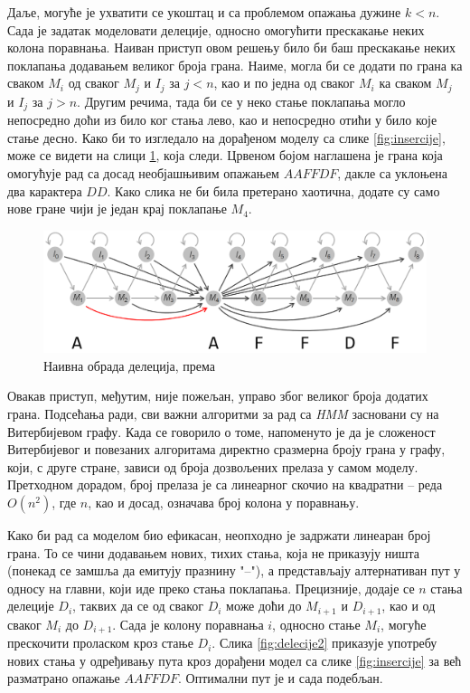 \documentclass[12pt,oneside]{memoir}
\begin{document}
\begin{CJK}{UTF8}{ipxm}
Даље, могуће је ухватити се укоштац и са проблемом опажања дужине $k < n$. Сада је задатак моделовати делеције, односно омогућити прескакање неких колона поравнања. Наиван приступ овом решењу било би баш прескакање неких поклапања додавањем великог броја грана. Наиме, могла би се додати по грана ка сваком $M_i$ од сваког $M_j$ и $I_j$ за $j < n$, као и по једна од сваког $M_i$ ка сваком $M_j$ и $I_j$ за $j > n$. Другим речима, тада би се у неко стање поклапања могло непосредно доћи из било ког стања лево, као и непосредно отићи у било које стање десно. Како би то изгледало на дорађеном моделу са слике \ref{fig:insercije}, може се видети на слици \ref{fig:delecije1}, која следи. Црвеном бојом наглашена је грана која омогућује рад са досад необјашњивим опажањем $AAFFDF$, дакле са уклоњена два карактера $DD$. Како слика не би била претерано хаотична, додате су само нове гране чији је један крај поклапање $M_4$.

\begin{figure}[H]
  \centering
  \includegraphics[width=\textwidth]{delecije1.png}
  \caption{Наивна обрада делеција, према \cite{compeau2015}}
  \label{fig:delecije1}
\end{figure}

Овакав приступ, међутим, није пожељан, управо због великог броја додатих грана. Подсећања ради, сви важни алгоритми за рад са \textit{HMM} засновани су на Витербијевом графу. Када се говорило о томе, напоменуто је да је сложеност Витербијевог и повезаних алгоритама директно сразмерна броју грана у графу, који, с друге стране, зависи од броја дозвољених прелаза у самом моделу. Претходном дорадом, број прелаза је са линеарног скочио на квадратни -- реда $O(n^2)$, где $n$, као и досад, означава број колона у поравнању.

Како би рад са моделом био ефикасан, неопходно је задржати линеаран број грана. То се чини додавањем нових, тихих стања, која не приказују ништа (понекад се замшља да емитују празнину "--"), а представљају алтернативан пут у односу на главни, који иде преко стања поклапања. Прецизније, додаје се $n$ стања делеције $D_i$, таквих да се од сваког $D_i$ може доћи до $M_{i+1}$ и $D_{i+1}$, као и од сваког $M_i$ до $D_{i+1}$. Сада је колону поравнања $i$, односно стање $M_i$, могуће прескочити проласком кроз стање $D_i$. Слика \ref{fig:delecije2} приказује употребу нових стања у одређивању пута кроз дорађени модел са слике \ref{fig:insercije} за већ разматрано опажање $AAFFDF$. Оптимални пут је и сада подебљан.


\end{CJK}
\end{document}
